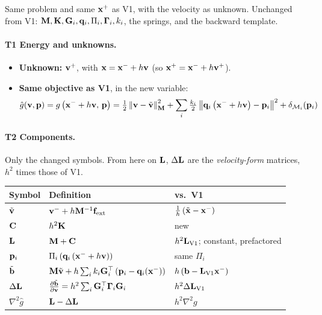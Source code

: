 \noindent Same problem and same $\mathbf{x}^+$ as V1, with the velocity as unknown. Unchanged from V1: $\mathbf{M}, \mathbf{K}, \mathbf{G}_i, \mathbf{q}_i, \Pi_i, \boldsymbol{\Gamma}_i, k_i$, the springs, and the backward template.

\paragraph{T1 Energy and unknowns.}\mbox{}
\begin{itemize}
    \item \textbf{Unknown:} $\mathbf{v}^+$, with $\mathbf{x} = \mathbf{x}^- + h\mathbf{v}$ (so $\mathbf{x}^+ = \mathbf{x}^- + h\mathbf{v}^+$).
    \item \textbf{Same objective as V1}, in the new variable:
    \begin{equation*}
        \hat g(\mathbf{v}, \mathbf{p}) = g\left(\mathbf{x}^- + h\mathbf{v},\, \mathbf{p}\right) = \tfrac{1}{2}\left\|\mathbf{v} - \tilde{\mathbf{v}}\right\|^2_{\mathbf{M}}
        + \sum_i \tfrac{k_i}{2}\left\|\mathbf{q}_i\left(\mathbf{x}^- + h\mathbf{v}\right) - \mathbf{p}_i\right\|^2 + \delta_{\mathcal{M}_i}(\mathbf{p}_i)
    \end{equation*}
\end{itemize}
\paragraph{T2 Components.}\mbox{}
\newline Only the changed symbols. From here on $\mathbf{L}$, $\Delta\mathbf{L}$ are the \emph{velocity-form} matrices, $h^2$ times those of V1.
\begin{center}
\renewcommand{\arraystretch}{1.4}
\begin{tabular}{lll}
\textbf{Symbol} & \textbf{Definition} & \textbf{vs.\ V1} \\ \hline
$\tilde{\mathbf{v}}$     & $\mathbf{v}^- + h\mathbf{M}^{-1}\mathbf{f}_{\text{ext}}$ & $\tfrac{1}{h}\left(\tilde{\mathbf{x}} - \mathbf{x}^-\right)$ \\
$\mathbf{C}$          & $h^2\mathbf{K}$                          & new \\
$\mathbf{L}$         & $\mathbf{M} + \mathbf{C}$                         & $h^2\mathbf{L}_{\text{V1}}$; constant, prefactored \\
$\mathbf{p}_i$        & $\Pi_i\left(\mathbf{q}_i\left(\mathbf{x}^- + h\mathbf{v}\right)\right)$ & same $\Pi_i$ \\
$\tilde{\mathbf{b}}$   & $\mathbf{M}\tilde{\mathbf{v}} + h\sum_i k_i\mathbf{G}_i^\top\left(\mathbf{p}_i - \mathbf{q}_i(\mathbf{x}^-)\right)$ & $h\left(\mathbf{b} - \mathbf{L}_{\text{V1}}\mathbf{x}^-\right)$ \\
$\Delta\mathbf{L}$   & $\frac{\partial \tilde{\mathbf{b}}}{\partial \mathbf{v}} = h^2\sum_i\mathbf{G}_i^\top\boldsymbol{\Gamma}_i\mathbf{G}_i$ & $h^2\Delta\mathbf{L}_{\text{V1}}$ \\
$\nabla^2\hat g$ & $\mathbf{L} - \Delta\mathbf{L}$              & $h^2\nabla^2 g$ \\
\end{tabular}
\end{center}

